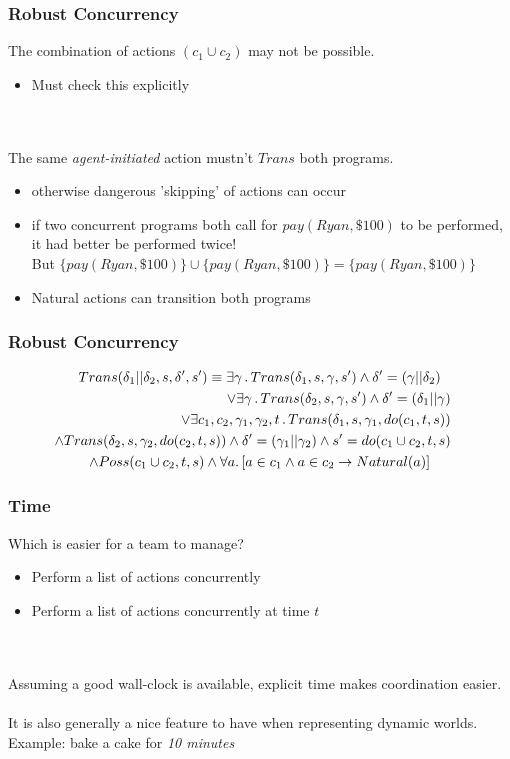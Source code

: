 \documentclass[compress]{beamer}
\begin{document}
\begin{frame}
\frametitle{Robust Concurrency}
The combination of actions $(c_1\cup c_2)$ may not be possible.
\begin{itemize}
  \item Must check this explicitly
\end{itemize}
\ \\
\ \\
The same \emph{agent-initiated} action mustn't $Trans$ both programs.
\begin{itemize}
  \item otherwise dangerous 'skipping' of actions can occur
  \item if two concurrent programs both call for $pay(Ryan,\$100)$ to be performed, it had better be performed twice!\\
  \tiny{But $\{pay(Ryan,\$100)\}\cup \{pay(Ryan,\$100)\} = \{pay(Ryan,\$100)\}$}
  \item Natural actions can transition both programs
\end{itemize}
\end{frame}

\begin{frame}
\frametitle{Robust Concurrency}
\begin{multline*}
Trans(\delta_{1}||\delta_{2},s,\delta',s')\equiv\exists\gamma\,.\, Trans(\delta_{1},s,\gamma,s')\wedge\delta'=(\gamma||\delta_{2})\\
\shoveright{\vee\exists\gamma\,.\, Trans(\delta_{2},s,\gamma,s')\wedge\delta'=(\delta_{1}||\gamma)}\\
\shoveright{\vee\exists c_{1},c_{2},\gamma_{1},\gamma_{2},t\,.\, Trans(\delta_{1},s,\gamma_{1},do(c_{1},t,s))}\\
\shoveright{\wedge Trans(\delta_{2},s,\gamma_{2},do(c_{2},t,s))\wedge\delta'=(\gamma_1||\gamma_2)\wedge s'=do(c_1\cup c_2,t,s)}\\
\wedge Poss(c_1\cup c_2,t,s)\wedge\forall a.\left[a\in c_{1}\wedge a\in c_{2}\rightarrow Natural(a)\right]
\end{multline*}
\end{frame}

\begin{frame}
\frametitle{Time}
Which is easier for a team to manage?
\begin{itemize}
  \pause
  \item Perform a list of actions concurrently
  \pause
  \item Perform a list of actions concurrently at time $t$
\end{itemize}
\ \\
\ \\
\pause
Assuming a good wall-clock is available, explicit time makes coordination easier.\\
\ \\
It is also generally a nice feature to have when representing dynamic worlds.
Example: bake a cake for \emph{10 minutes}
\end{frame}
\end{document}
